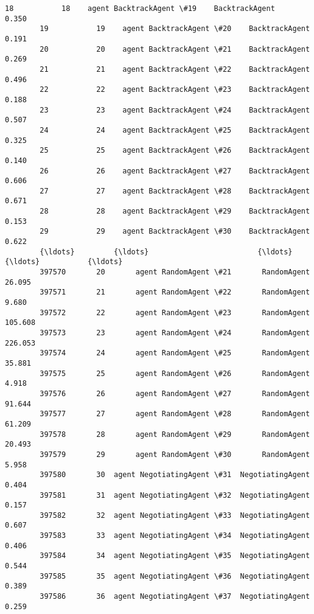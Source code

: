 \documentclass[11pt]{article}
\begin{document}
\begin{Verbatim}[commandchars=\\\{\}]
        18           18    agent BacktrackAgent \#19    BacktrackAgent         0.350   
        19           19    agent BacktrackAgent \#20    BacktrackAgent         0.191   
        20           20    agent BacktrackAgent \#21    BacktrackAgent         0.269   
        21           21    agent BacktrackAgent \#22    BacktrackAgent         0.496   
        22           22    agent BacktrackAgent \#23    BacktrackAgent         0.188   
        23           23    agent BacktrackAgent \#24    BacktrackAgent         0.507   
        24           24    agent BacktrackAgent \#25    BacktrackAgent         0.325   
        25           25    agent BacktrackAgent \#26    BacktrackAgent         0.140   
        26           26    agent BacktrackAgent \#27    BacktrackAgent         0.606   
        27           27    agent BacktrackAgent \#28    BacktrackAgent         0.671   
        28           28    agent BacktrackAgent \#29    BacktrackAgent         0.153   
        29           29    agent BacktrackAgent \#30    BacktrackAgent         0.622   
        {\ldots}         {\ldots}                         {\ldots}               {\ldots}           {\ldots}   
        397570       20       agent RandomAgent \#21       RandomAgent        26.095   
        397571       21       agent RandomAgent \#22       RandomAgent         9.680   
        397572       22       agent RandomAgent \#23       RandomAgent       105.608   
        397573       23       agent RandomAgent \#24       RandomAgent       226.053   
        397574       24       agent RandomAgent \#25       RandomAgent        35.881   
        397575       25       agent RandomAgent \#26       RandomAgent         4.918   
        397576       26       agent RandomAgent \#27       RandomAgent        91.644   
        397577       27       agent RandomAgent \#28       RandomAgent        61.209   
        397578       28       agent RandomAgent \#29       RandomAgent        20.493   
        397579       29       agent RandomAgent \#30       RandomAgent         5.958   
        397580       30  agent NegotiatingAgent \#31  NegotiatingAgent         0.404   
        397581       31  agent NegotiatingAgent \#32  NegotiatingAgent         0.157   
        397582       32  agent NegotiatingAgent \#33  NegotiatingAgent         0.607   
        397583       33  agent NegotiatingAgent \#34  NegotiatingAgent         0.406   
        397584       34  agent NegotiatingAgent \#35  NegotiatingAgent         0.544   
        397585       35  agent NegotiatingAgent \#36  NegotiatingAgent         0.389   
        397586       36  agent NegotiatingAgent \#37  NegotiatingAgent         0.259   

\end{Verbatim}
\end{document}
